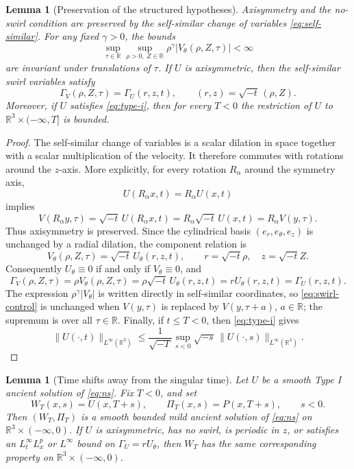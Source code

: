 \documentclass[11pt]{amsart}
\theoremstyle{plain}
\newtheorem{lemma}[theorem]{Lemma}
\theoremstyle{definition}
\theoremstyle{remark}
\numberwithin{equation}{section}
\begin{document}
\begin{lemma}[Preservation of the structured hypotheses]
\label{lem:structure-preserved}
Axisymmetry and the no-swirl condition are preserved by the self-similar change
of variables \eqref{eq:self-similar}.  For any fixed \(\gamma>0\), the bounds
\begin{equation}\label{eq:swirl-control}
\sup_{\tau\in\mathbb R}\sup_{\rho>0,\ Z\in\mathbb R}
\rho^\gamma |V_\theta(\rho,Z,\tau)|<\infty
\end{equation}
are invariant under translations of \(\tau\).  If \(U\) is axisymmetric, then
the self-similar swirl variables satisfy
\[
   \Gamma_V(\rho,Z,\tau)=\Gamma_U(r,z,t),
   \qquad (r,z)=\sqrt{-t}\,(\rho,Z).
\]
Moreover, if \(U\) satisfies \eqref{eq:type-i}, then for every \(T<0\) the
restriction of \(U\) to \(\mathbb R^3\times(-\infty,T]\) is bounded.
\end{lemma}

\begin{proof}
The self-similar change of variables is a scalar dilation in space together with
a scalar multiplication of the velocity.  It therefore commutes with rotations
around the \(z\)-axis.  More explicitly, for every rotation \(R_\alpha\) around
the symmetry axis,
\[
   U(R_\alpha x,t)=R_\alpha U(x,t)
\]
implies
\[
   V(R_\alpha y,\tau)
   =\sqrt{-t}\,U(R_\alpha x,t)
   =R_\alpha\sqrt{-t}\,U(x,t)
   =R_\alpha V(y,\tau).
\]
Thus axisymmetry is preserved.  Since the cylindrical basis
\((e_r,e_\theta,e_z)\) is unchanged by a radial dilation, the component
relation is
\[
   V_\theta(\rho,Z,\tau)=\sqrt{-t}\,
      U_\theta(r,z,t),
   \qquad r=\sqrt{-t}\rho,\quad z=\sqrt{-t}Z .
\]
Consequently \(U_\theta\equiv0\) if and only if \(V_\theta\equiv0\), and
\[
   \Gamma_V(\rho,Z,\tau)
   =\rho V_\theta(\rho,Z,\tau)
   =\rho\sqrt{-t}\,U_\theta(r,z,t)
   =rU_\theta(r,z,t)
   =\Gamma_U(r,z,t).
\]
The expression \(\rho^\gamma |V_\theta|\) is written directly in
self-similar coordinates, so \eqref{eq:swirl-control} is unchanged when
\(V(y,\tau)\) is replaced by \(V(y,\tau+a)\), \(a\in\mathbb R\); the supremum is
over all \(\tau\in\mathbb R\).  Finally, if \(t\le T<0\), then
\eqref{eq:type-i} gives
\[
\|U(\cdot,t)\|_{L^\infty(\mathbb R^3)}
\le
\frac{1}{\sqrt{-T}}
\sup_{s<0}\sqrt{-s}\,\|U(\cdot,s)\|_{L^\infty(\mathbb R^3)} .
\]
\end{proof}

\begin{lemma}[Time shifts away from the singular time]\label{lem:time-shift}
Let \(U\) be a smooth Type I ancient solution of \eqref{eq:ns}.  Fix
\(T<0\), and set
\[
   W_T(x,s)=U(x,T+s),\qquad \Pi_T(x,s)=P(x,T+s),\qquad s<0.
\]
Then \((W_T,\Pi_T)\) is a smooth bounded mild ancient solution of
\eqref{eq:ns} on \(\mathbb R^3\times(-\infty,0)\).  If \(U\) is axisymmetric,
has no swirl, is periodic in \(z\), or satisfies an \(L_t^\infty L_x^p\) or
\(L^\infty\) bound on \(\Gamma_U=rU_\theta\), then \(W_T\) has the same
corresponding property on \(\mathbb R^3\times(-\infty,0)\).
\end{lemma}
\end{document}
